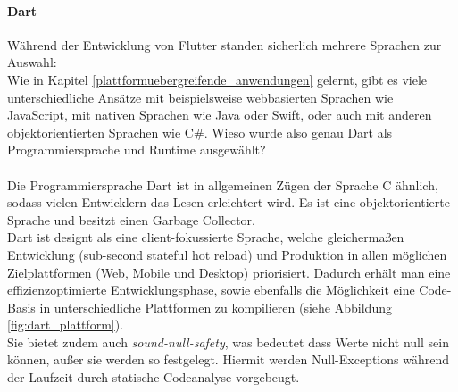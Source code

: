 \paragraph{Dart}
Während der Entwicklung von Flutter standen sicherlich mehrere Sprachen zur Auswahl: \\Wie in Kapitel \ref{plattformuebergreifende_anwendungen} gelernt, gibt es viele unterschiedliche Ansätze mit beispielsweise webbasierten Sprachen wie JavaScript, mit nativen Sprachen wie Java oder Swift, oder auch mit anderen objektorientierten Sprachen wie C\#. Wieso wurde also genau Dart als Programmiersprache und Runtime ausgewählt?\\
\\
Die Programmiersprache Dart ist in allgemeinen Zügen der Sprache C ähnlich,  sodass vielen Entwicklern das Lesen erleichtert wird. Es ist eine objektorientierte Sprache und besitzt einen Garbage Collector.\\
Dart ist designt als eine client-fokussierte Sprache, welche gleichermaßen Entwicklung (sub-second stateful hot reload) und Produktion in allen möglichen Zielplattformen (Web, Mobile und Desktop) priorisiert. Dadurch erhält man eine effizienzoptimierte Entwicklungsphase, sowie ebenfalls die Möglichkeit eine Code-Basis in unterschiedliche Plattformen zu kompilieren (siehe Abbildung \ref{fig:dart_plattform}).\\
Sie bietet zudem auch \textit{sound-null-safety}, was bedeutet dass Werte nicht null sein können, außer sie werden so festgelegt. Hiermit werden Null-Exceptions während der Laufzeit durch statische Codeanalyse vorgebeugt.

